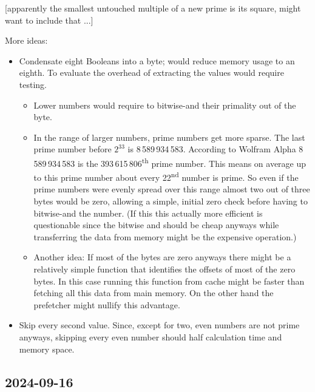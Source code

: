 \documentclass[a4paper,10pt]{article}
\begin{document}
[apparently the smallest untouched multiple of a new prime is its square, might want to include that ...]

More ideas:
\begin{itemize}
 \item Condensate eight Booleans into a byte; would reduce memory usage to an eighth. To evaluate the overhead of extracting the values would require testing.
 \begin{itemize}
  \item Lower numbers would require to bitwise-and their primality out of the byte.
  \item In the range of larger numbers, prime numbers get more sparse.
  The last prime number before $2^{33}$ is 8\,589\,934\,583.
  According to Wolfram Alpha 8\,589\,934\,583 is the 393\,615\,806\textsuperscript{th} prime number.
  This means on average up to this prime number about every 22\textsuperscript{nd} number is prime.
  So even if the prime numbers were evenly spread over this range almost two out of three bytes would be zero,
  allowing a simple, initial zero check before having to bitwise-and the number.
  (If this this actually more efficient is questionable since the bitwise and should be cheap anyways
  while transferring the data from memory might be the expensive operation.)
  \item Another idea:
  If most of the bytes are zero anyways there might be a relatively simple function that identifies the offsets of most of the zero bytes.
  In this case running this function from cache might be faster than fetching all this data from main memory.
  On the other hand the prefetcher might nullify this advantage.
 \end{itemize}
 \item Skip every second value.
 Since, except for two, even numbers are not prime anyways,
 skipping every even number should half calculation time and memory space.

\end{itemize}


\subsection*{2024-09-16}
\end{document}
